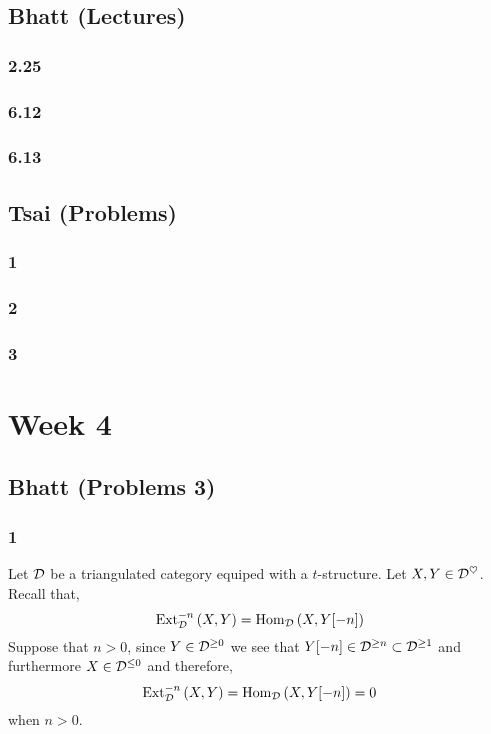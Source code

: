 \documentclass[12pt]{article}
\begin{document}
\subsection{Bhatt (Lectures)}

\subsubsection*{2.25}

\subsubsection*{6.12}

\subsubsection*{6.13}

\subsection{Tsai (Problems)}

\subsubsection*{1}

\subsubsection*{2}

\subsubsection*{3}

\section{Week 4}

\subsection{Bhatt (Problems 3)}

\subsubsection*{1}

\newcommand{\heart}{\ensuremath\heartsuit}

Let $\mathcal{D}$ be a triangulated category equiped with a $t$-structure. Let $X, Y \in \D^{\heart}$. Recall that,
\[ \mathrm{Ext}^{-n}_{\mathcal{D}} \left( X, Y \right) = \mathrm{Hom}_{\mathcal{D}} \left( X, Y[-n] \right) \]
Suppose that $n > 0$, since $Y \in \mathcal{D}^{\ge 0}$ we see that $Y[-n] \in \mathcal{D}^{\ge n} \subset \mathcal{D}^{\ge 1}$ and furthermore $X \in \mathcal{D}^{\le 0}$ and therefore,
\[ \mathrm{Ext}^{-n}_{\mathcal{D}} \left( X, Y \right) = \mathrm{Hom}_{\mathcal{D}} \left( X, Y[-n] \right) = 0 \]
when $n > 0$.
\end{document}
